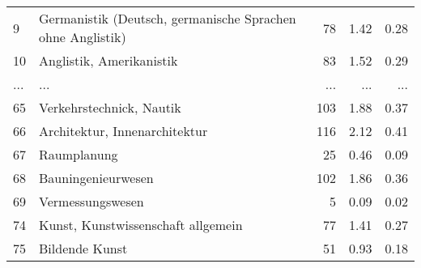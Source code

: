 \begin{longtable}{lXrrr}
        9 & \multicolumn{1}{X}{Germanistik (Deutsch, germanische Sprachen ohne Anglistik)} & %
          \num{78} &
          \num[round-mode=places,round-precision=2]{1,42} &
          \num[round-mode=places,round-precision=2]{0,28} \\
        10 & \multicolumn{1}{X}{Anglistik, Amerikanistik} & %
          \num{83} &
          \num[round-mode=places,round-precision=2]{1,52} &
          \num[round-mode=places,round-precision=2]{0,29} \\
       ... & ... & ... & ... & ... \\
        65 & \multicolumn{1}{X}{Verkehrstechnick, Nautik} & %
          \num{103} &
          \num[round-mode=places,round-precision=2]{1,88} &
          \num[round-mode=places,round-precision=2]{0,37} \\

        66 & \multicolumn{1}{X}{Architektur, Innenarchitektur} & %
          \num{116} &
          \num[round-mode=places,round-precision=2]{2,12} &
          \num[round-mode=places,round-precision=2]{0,41} \\

        67 & \multicolumn{1}{X}{Raumplanung} & %
          \num{25} &
          \num[round-mode=places,round-precision=2]{0,46} &
          \num[round-mode=places,round-precision=2]{0,09} \\

        68 & \multicolumn{1}{X}{Bauningenieurwesen} & %
          \num{102} &
          \num[round-mode=places,round-precision=2]{1,86} &
          \num[round-mode=places,round-precision=2]{0,36} \\

        69 & \multicolumn{1}{X}{Vermessungswesen} & %
          \num{5} &
          \num[round-mode=places,round-precision=2]{0,09} &
          \num[round-mode=places,round-precision=2]{0,02} \\

        74 & \multicolumn{1}{X}{Kunst, Kunstwissenschaft allgemein} & %
          \num{77} &
          \num[round-mode=places,round-precision=2]{1,41} &
          \num[round-mode=places,round-precision=2]{0,27} \\

        75 & \multicolumn{1}{X}{Bildende Kunst} & %
          \num{51} &
          \num[round-mode=places,round-precision=2]{0,93} &
          \num[round-mode=places,round-precision=2]{0,18} \\


\end{longtable}
